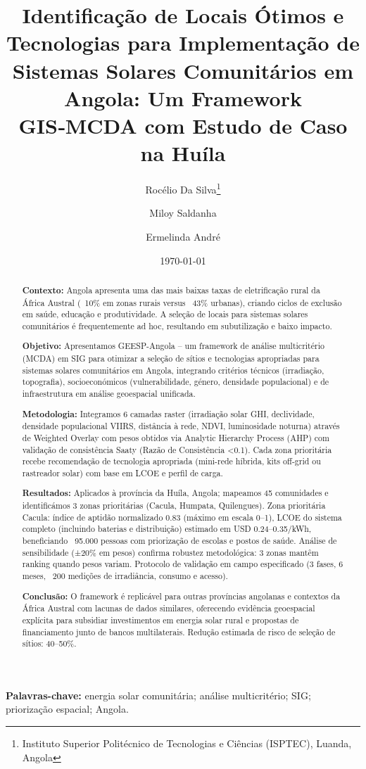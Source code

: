 \documentclass[12pt, a4paper]{article}
\begin{document}
\title{Identificação de Locais Ótimos e Tecnologias para Implementação de Sistemas Solares Comunitários em Angola: Um Framework GIS‑MCDA com Estudo de Caso na Huíla}
\author{Rocélio Da Silva\thanks{Instituto Superior Politécnico de Tecnologias e Ciências (ISPTEC), Luanda, Angola} \and Miloy Saldanha\footnotemark[1] \and Ermelinda André\footnotemark[1]}
\date{\today}
\maketitle

\begin{abstract}
\textbf{Contexto:} Angola apresenta uma das mais baixas taxas de eletrificação rural da África Austral (~10\% em zonas rurais versus ~43\% urbanas), criando ciclos de exclusão em saúde, educação e produtividade. A seleção de locais para sistemas solares comunitários é frequentemente ad hoc, resultando em subutilização e baixo impacto.

\textbf{Objetivo:} Apresentamos GEESP-Angola – um framework de análise multicritério (MCDA) em SIG para otimizar a seleção de sítios e tecnologias apropriadas para sistemas solares comunitários em Angola, integrando critérios técnicos (irradiação, topografia), socioeconómicos (vulnerabilidade, género, densidade populacional) e de infraestrutura em análise geoespacial unificada.

\textbf{Metodologia:} Integramos 6 camadas raster (irradiação solar GHI, declividade, densidade populacional VIIRS, distância à rede, NDVI, luminosidade noturna) através de Weighted Overlay com pesos obtidos via Analytic Hierarchy Process (AHP) com validação de consistência Saaty (Razão de Consistência <0.1). Cada zona prioritária recebe recomendação de tecnologia apropriada (mini-rede híbrida, kits off-grid ou rastreador solar) com base em LCOE e perfil de carga.

\textbf{Resultados:} Aplicados à província da Huíla, Angola; mapeamos 45 comunidades e identificámos 3 zonas prioritárias (Cacula, Humpata, Quilengues). Zona prioritária Cacula: índice de aptidão normalizado 0.83 (máximo em escala 0–1), LCOE do sistema completo (incluindo baterias e distribuição) estimado em USD 0.24–0.35/kWh, beneficiando ~95.000 pessoas com priorização de escolas e postos de saúde. Análise de sensibilidade (±20\% em pesos) confirma robustez metodológica: 3 zonas mantêm ranking quando pesos variam. Protocolo de validação em campo especificado (3 fases, 6 meses, ~200 medições de irradiância, consumo e acesso).

\textbf{Conclusão:} O framework é replicável para outras províncias angolanas e contextos da África Austral com lacunas de dados similares, oferecendo evidência geoespacial explícita para subsidiar investimentos em energia solar rural e propostas de financiamento junto de bancos multilaterais. Redução estimada de risco de seleção de sítios: 40–50\%.
\end{abstract}
\vspace{6pt}
\noindent\textbf{Palavras-chave:} energia solar comunitária; análise multicritério; SIG; priorização espacial; Angola.
\end{document}
